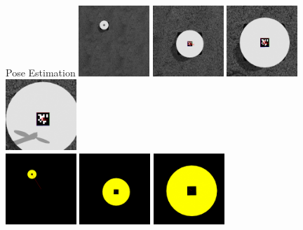 \documentclass[]{beamer}
\begin{document}
\begin{frame}{Pose Estimation}
    \centering
        \includegraphics[width=0.2\textwidth]{../images/image2_18469000.png}
        \includegraphics[width=0.2\textwidth]{../images/image2_30863000.png}
        \includegraphics[width=0.2\textwidth]{../images/image2_36074000.png}
        \includegraphics[width=0.2\textwidth]{../images/image2_38233000.png}\\
        \includegraphics[width=0.2\textwidth]{../images/image1_18469000_proc.png}
        \includegraphics[width=0.2\textwidth]{../images/image1_30863000_proc.png}
        \includegraphics[width=0.2\textwidth]{../images/image1_36074000_proc.png}

\end{frame}
\end{document}
